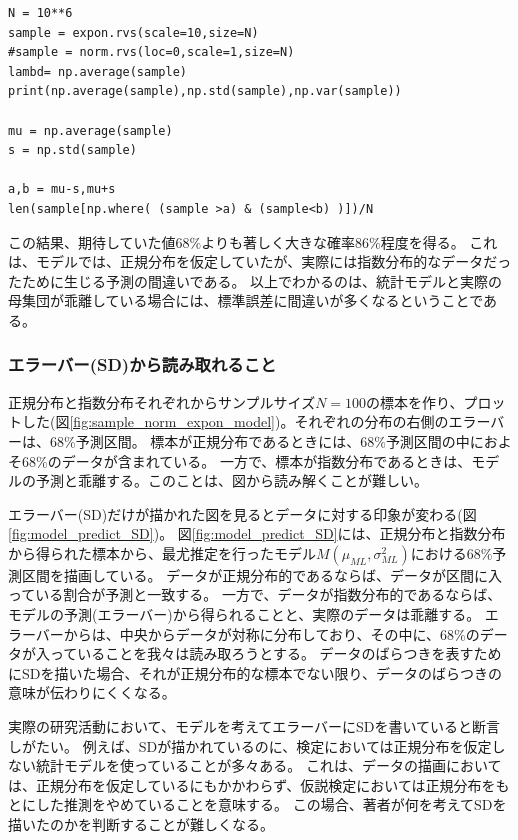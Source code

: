 \begin{lstlisting}
N = 10**6
sample = expon.rvs(scale=10,size=N)
#sample = norm.rvs(loc=0,scale=1,size=N)
lambd= np.average(sample)
print(np.average(sample),np.std(sample),np.var(sample))

mu = np.average(sample)
s = np.std(sample)

a,b = mu-s,mu+s
len(sample[np.where( (sample >a) & (sample<b) )])/N
\end{lstlisting}
この結果、期待していた値$68\%$よりも著しく大きな確率$86\%$程度を得る。
これは、モデルでは、正規分布を仮定していたが、実際には指数分布的なデータだったために生じる予測の間違いである。
以上でわかるのは、統計モデルと実際の母集団が乖離している場合には、標準誤差に間違いが多くなるということである。

\subsubsection{エラーバー(SD)から読み取れること}
正規分布と指数分布それぞれからサンプルサイズ$N=100$の標本を作り、プロットした(図\ref{fig:sample_norm_expon_model})。それぞれの分布の右側のエラーバーは、$68\%$予測区間。
標本が正規分布であるときには、$68\%$予測区間の中におよそ$68\%$のデータが含まれている。
一方で、標本が指数分布であるときは、モデルの予測と乖離する。このことは、図から読み解くことが難しい。

エラーバー(SD)だけが描かれた図を見るとデータに対する印象が変わる(図\ref{fig:model_predict_SD})。
図\ref{fig:model_predict_SD}には、正規分布と指数分布から得られた標本から、最尤推定を行ったモデル$M(\mu_{ML},\sigma^2_{ML})$における$68\%$予測区間を描画している。
データが正規分布的であるならば、データが区間に入っている割合が予測と一致する。
一方で、データが指数分布的であるならば、モデルの予測(エラーバー)から得られることと、実際のデータは乖離する。
エラーバーからは、中央からデータが対称に分布しており、その中に、$68\%$のデータが入っていることを我々は読み取ろうとする。
データのばらつきを表すためにSDを描いた場合、それが正規分布的な標本でない限り、データのばらつきの意味が伝わりにくくなる。

実際の研究活動において、モデルを考えてエラーバーにSDを書いていると断言しがたい。
例えば、SDが描かれているのに、検定においては正規分布を仮定しない統計モデルを使っていることが多々ある。
これは、データの描画においては、正規分布を仮定しているにもかかわらず、仮説検定においては正規分布をもとにした推測をやめていることを意味する。
この場合、著者が何を考えてSDを描いたのかを判断することが難しくなる。

